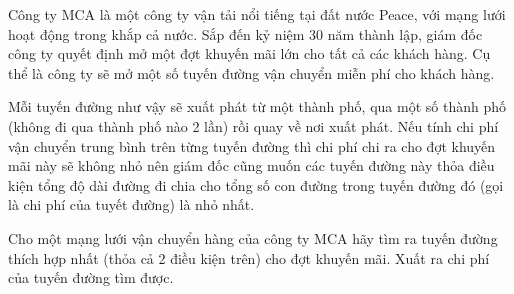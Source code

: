 Công ty MCA là một công ty vận tải nổi tiếng tại đất nước Peace, với mạng lưới hoạt động trong khắp cả nước. Sắp đến kỷ niệm 30 năm thành lập, giám đốc công ty quyết định mở một đợt khuyến mãi lớn cho tất cả các khách hàng. Cụ thể là công ty sẽ mở một số tuyến đường vận chuyển miễn phí cho khách hàng.  

   Mỗi tuyến đường như vậy sẽ xuất phát từ một thành phố, qua một số thành phố (không đi qua thành phố nào 2 lần) rồi quay về nơi xuất phát. Nếu tính chi phí vận chuyển trung bình trên từng tuyến đường thì chi phí chi ra cho đợt khuyến mãi này sẽ không nhỏ nên giám đốc cũng muốn các tuyến đường này thỏa điều kiện tổng độ dài đường đi chia cho tổng số con đường trong tuyến đường đó (gọi là chi phí của tuyết đường) là nhỏ nhất.  

   Cho một mạng lưới vận chuyển hàng của công ty MCA hãy tìm ra tuyến đường thích hợp nhất (thỏa cả 2 điều kiện trên) cho đợt khuyến mãi. Xuất ra chi phí của tuyến đường tìm được.  

\